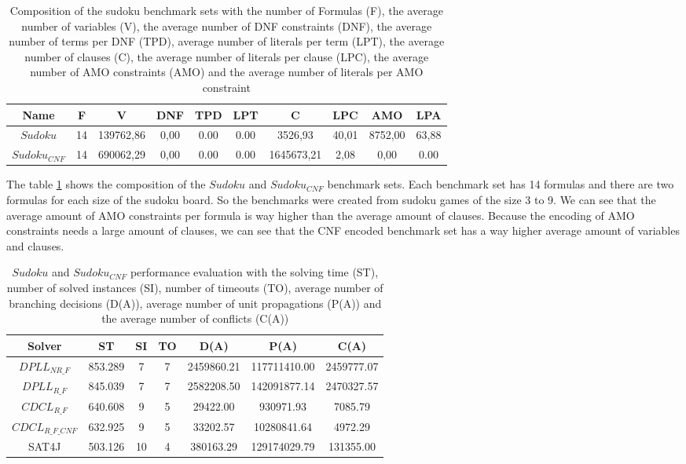 \begin{table}[!htb]
\centering
\caption[Composition of the sudoku benchmark sets]{Composition of the sudoku benchmark sets with the number of Formulas (F), the average number of variables (V), the average number of DNF constraints (DNF), the average number of terms per DNF (TPD), average number of literals per term (LPT), the average number of clauses (C), the average number of literals per clause (LPC), the average number of AMO constraints (AMO) and the average number of literals per AMO constraint}
\label{tab:sudoku}
\begin{tabular}{|c|c|c|c|c|c|c|c|c|c|}
\hline
Name & F & V & DNF & TPD & LPT & C & LPC & AMO & LPA \\
\hline
$Sudoku$ & 14 & 139762,86 & 0,00 & 0.00 & 0.00 & 3526,93 & 40,01 & 8752,00 & 63,88 \\ 
 \hline 
$Sudoku_{CNF}$ & 14 & 690062,29 & 0,00 & 0.00 & 0.00 & 1645673,21 & 2,08 & 0,00 & 0.00 \\ 
 \hline 
\end{tabular}
\end{table}

The table \ref{tab:sudoku} shows the composition of the $Sudoku$ and $Sudoku_{CNF}$ benchmark sets. Each benchmark set has 14 formulas and there are two formulas for each size of the sudoku board. So the benchmarks were created from sudoku games of the size 3 to 9. We can see that the average amount of AMO constraints per formula is way higher than the average amount of clauses. Because the encoding of AMO constraints needs a large amount of clauses, we can see that the CNF encoded benchmark set has a way higher average amount of variables and clauses.

\begin{table}[!htb]
\centering
\caption[$Sudoku$ and $Sudoku_{CNF}$ performance evaluation]{$Sudoku$ and $Sudoku_{CNF}$ performance evaluation with the solving time (ST), number of solved instances (SI), number of timeouts (TO), average number of branching decisions (D(A)), average number of unit propagations (P(A)) and the average number of conflicts (C(A))}
\label{tab:sudokuSat}
\begin{tabular}{|c|c|c|c|c|c|c|}
\hline
Solver & ST & SI & TO & D(A) & P(A) & C(A)\\ 
\hline
$DPLL_{NR\_F}$ & 853.289 & 7 & 7 & 2459860.21 & 117711410.00 & 2459777.07 \\ 
\hline
$DPLL_{R\_F}$ & 845.039 & 7 & 7 & 2582208.50 & 142091877.14 & 2470327.57 \\ 
\hline
$CDCL_{R\_F}$ & 640.608 & 9 & 5 & 29422.00 & 930971.93 & 7085.79 \\ 
\hline
$CDCL_{R\_F\_CNF}$ & 632.925 & 9 & 5 & 33202.57 & 10280841.64 & 4972.29 \\ 
\hline
SAT4J & 503.126 & 10 & 4 & 380163.29 & 129174029.79 & 131355.00 \\ 
\hline
\end{tabular}
\end{table}

